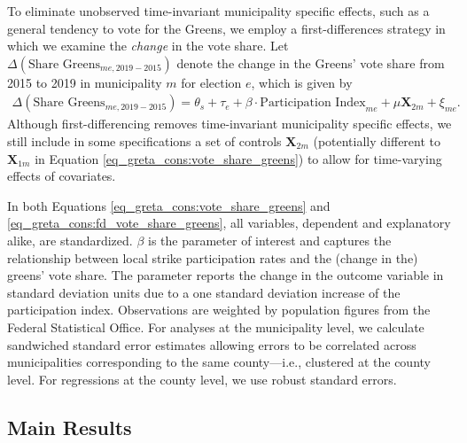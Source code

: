 To eliminate unobserved time-invariant municipality specific effects, such as a general tendency to vote for the Greens, we employ a first-differences strategy in which we examine the \textit{change} in the vote share. Let $\Delta(\text{Share Greens}_{me,2019-2015})$ denote the change in the Greens' vote share from 2015 to 2019 in municipality $m$ for election $e$, which is given by
\begin{align}
	\Delta(\text{Share Greens}_{me,2019-2015}) = \theta_s + \tau_e + \beta\cdot\text{Participation Index}_{me} + \mu \mathbf{X}_{2m} + \xi_{me}.\label{eq_greta_cons:fd_vote_share_greens}
\end{align}
Although first-differencing removes time-invariant municipality specific effects, we still include in some specifications a set of controls $\mathbf{X}_{2m}$ (potentially different to $\mathbf{X}_{1m}$ in Equation \ref{eq_greta_cons:vote_share_greens}) to allow for time-varying effects of covariates.


In both Equations \ref{eq_greta_cons:vote_share_greens} and \ref{eq_greta_cons:fd_vote_share_greens}, all variables, dependent and explanatory alike, are standardized. $\beta$ is the parameter of interest and captures the relationship between local strike participation rates and the (change in the) greens' vote share. The parameter reports the change in the outcome variable in standard deviation units due to a one standard deviation increase of the participation index. Observations are weighted by population figures from the Federal Statistical Office. For analyses at the municipality level, we calculate sandwiched standard error estimates allowing errors to be correlated across municipalities corresponding to the same county---i.e., clustered at the county level. For regressions at the county level, we use robust standard errors.





\subsection{Main Results}

\afterpage{}

